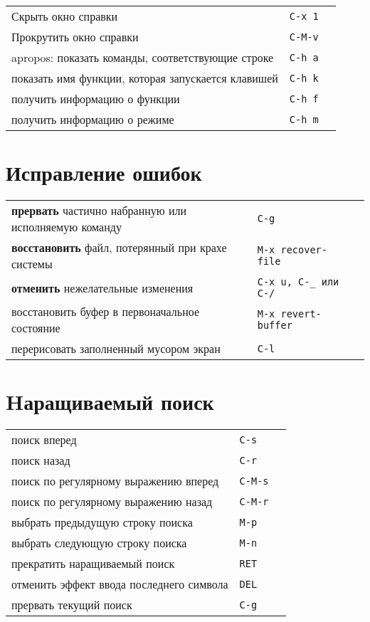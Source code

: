 \documentclass[10pt]{article}
\newlength{\ColWidth}
\newlength{\ColThreeWidth}
\newcommand{\kbd}[1]{\texttt{#1}}
\begin{document}
\begin{tabular}{p{\ColWidth}p{\ColThreeWidth}p{\ColThreeWidth}}
Скрыть окно справки & \kbd{C-x 1} \\
Прокрутить окно справки & \kbd{C-M-v} \\

apropos: показать команды, соответствующие строке & \kbd{C-h a} \\
показать имя функции, которая запускается клавишей & \kbd{C-h k} \\
получить информацию о функции & \kbd{C-h f} \\
получить информацию о режиме & \kbd{C-h m} \\
\end{tabular}

\section{Исправление ошибок}

\begin{tabular}{p{\ColWidth}p{\ColThreeWidth}p{\ColThreeWidth}}
{\bf прервать} частично набранную или исполняемую команду & \kbd{C-g} \\
{\bf восстановить} файл, потерянный при крахе системы & \kbd{M-x recover-file} \\
{\bf отменить} нежелательные изменения & \kbd{C-x u, C-\_ {\rm или} C-/} \\
восстановить буфер в первоначальное состояние & \kbd{M-x revert-buffer} \\
перерисовать заполненный мусором экран & \kbd{C-l} \\
\end{tabular}

\section{Hаращиваемый поиск}

\begin{tabular}{p{\ColWidth}p{\ColThreeWidth}p{\ColThreeWidth}}
поиск вперед & \kbd{C-s} \\
поиск назад & \kbd{C-r} \\
поиск по регулярному выражению вперед & \kbd{C-M-s} \\
поиск по регулярному выражению назад & \kbd{C-M-r} \\

выбрать предыдущую строку поиска & \kbd{M-p} \\
выбрать следующую строку поиска & \kbd{M-n} \\
прекратить наращиваемый поиск & \kbd{RET} \\
отменить эффект ввода последнего символа & \kbd{DEL} \\
прервать текущий поиск & \kbd{C-g} \\
\end{tabular}
\end{document}
